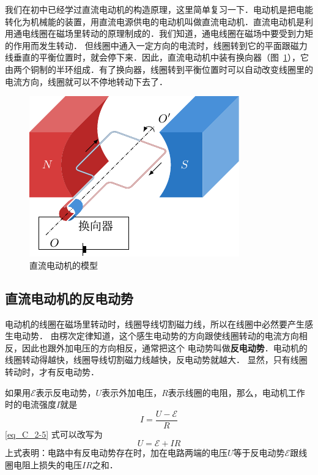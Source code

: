 我们在初中已经学过直流电动机的构造原理，这里简单复习一下．电动机是把电能转化为机械能的装置，用直流电源供电的电动机叫做直流电动机．直流电动机是利用通电线圈在磁场里转动的原理制成的．我们知道，通电线圈在磁场中要受到力矩的作用而发生转动．
但线圈中通入一定方向的电流时，线圈转到它的平面跟磁力线垂直的平衡位置时，就会停下来．因此，直流电动机中装有换向器（图~\ref{fig_C_2-24}），它由两个铜制的半环组成．有了换向器，线圈转到平衡位置时可以自动改变线圈里的电流方向，线圈就可以不停地转动下去了．
\begin{figure}[htbp]
    \centering
    \includegraphics{fig/C/2-24.pdf}
    \caption{直流电动机的模型}\label{fig_C_2-24}
\end{figure}

\subsection{直流电动机的反电动势}

电动机的线圈在磁场里转动时，线圈导线切割磁力线，所以在线圈中必然要产生感生电动势．
由楞次定律知道，这个感生电动势的方向跟使线圈转动的电流方向相反，因此也跟外加电压的方向相反，通常把这个
电动势叫做\textbf{反电动势}．电动机的线圈转动得越快，线圈导线切割磁力线越快，反电动势就越大．
显然，只有线圈转动时，才有反电动势．

如果用$\mathcal{E}$表示反电动势，$U$表示外加电压，$R$表示线圈的电阻，那么，电动机工作时的电流强度$I$就是
\begin{equation}\label{eq_C_2-5}
    I=\frac{U-\mathcal{E}}{R}
\end{equation}
 \eqref{eq_C_2-5} 式可以改写为
\begin{equation}\label{eq_C_2-6}
    U=\mathcal{E}+IR
\end{equation}
上式表明：电路中有反电动势存在时，加在电路两端的电压$U$等于反电动势$\mathcal{E}$跟线圈电阻上损失的电压$IR$之和．


